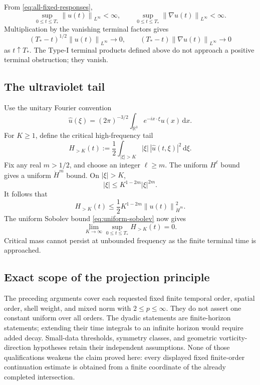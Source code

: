 \documentclass[11pt,letterpaper]{article}
\theoremstyle{definition}
\theoremstyle{remark}
\newcommand{\R}{\mathbb R}
\newcommand{\norm}[1]{\left\lVert #1\right\rVert}
\newcommand{\dd}{\,\mathrm d}
\begin{document}
From \eqref{eq:all-fixed-responses},
\[
\sup_{0\le t\le T_*}\norm{u(t)}_{L^\infty}<\infty,
\qquad
\sup_{0\le t\le T_*}\norm{\nabla u(t)}_{L^\infty}<\infty.
\]
Multiplication by the vanishing terminal factors gives
\begin{equation}
(T_*-t)^{1/2}\norm{u(t)}_{L^\infty}\longrightarrow0,
\qquad
(T_*-t)\norm{\nabla u(t)}_{L^\infty}\longrightarrow0
\label{eq:type-one}
\end{equation}
as \(t\uparrow T_*\).  The Type-I terminal products defined above do not
approach a positive terminal obstruction; they vanish.

\subsection{The ultraviolet tail}

Use the unitary Fourier convention
\[
\widehat u(\xi)
=(2\pi)^{-3/2}\int_{\R^3}e^{-ix\cdot\xi}u(x)\dd x.
\]
For \(K\ge1\), define the critical high-frequency tail
\[
H_{>K}(t)
:=\frac12\int_{|\xi|>K}|\xi|\,|\widehat u(t,\xi)|^2\dd\xi.
\]
Fix any real \(m>1/2\), and choose an integer \(\ell\ge m\).  The uniform
\(H^\ell\) bound gives a uniform \(\dot H^m\) bound.  On \(|\xi|>K\),
\[
|\xi|\le K^{1-2m}|\xi|^{2m}.
\]
It follows that
\[
H_{>K}(t)
\le\frac12K^{1-2m}\norm{u(t)}_{\dot H^m}^2.
\]
The uniform Sobolev bound \eqref{eq:uniform-sobolev} now gives
\begin{equation}
\boxed{
\lim_{K\to\infty}\sup_{0\le t\le T_*}H_{>K}(t)=0.}
\label{eq:uv-tail}
\end{equation}
Critical mass cannot persist at unbounded frequency as the finite terminal
time is approached.

\subsection{Exact scope of the projection principle}

The preceding arguments cover each requested fixed finite temporal order,
spatial order, shell weight, and mixed norm with \(2\le p\le\infty\).  They
do not assert one constant uniform over all orders.  The dyadic statements
are finite-horizon statements; extending their time integrals to an infinite
horizon would require added decay.  Small-data thresholds, symmetry classes,
and geometric vorticity-direction hypotheses retain their independent
assumptions.  None of those qualifications weakens the claim proved here:
every displayed fixed finite-order continuation estimate is obtained from a
finite coordinate of the already completed intersection.
\end{document}
